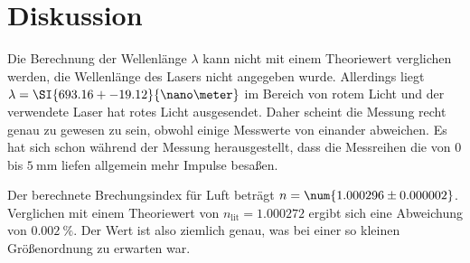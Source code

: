 \section{Diskussion}
\label{sec:Diskussion}


Die Berechnung der Wellenlänge $\lambda$ kann nicht mit einem Theoriewert verglichen werden, die Wellenlänge des Lasers nicht angegeben wurde. Allerdings liegt $\lambda = \SI{693.16+-19.12}{\nano\meter}$ im Bereich von rotem Licht und der verwendete Laser hat rotes Licht ausgesendet. 
Daher scheint die Messung recht genau zu gewesen zu sein, obwohl einige Messwerte von einander abweichen.
Es hat sich schon während der Messung herausgestellt, dass die Messreihen die von $0$ bis $\SI{5}{\milli\meter}$ liefen allgemein mehr Impulse besaßen.

Der berechnete Brechungsindex für Luft beträgt $n = \num{1.000296 \pm 0.000002}$.
Verglichen mit einem Theoriewert von $n_\text{lit} = \num{1.000272}$ ergibt sich eine Abweichung von $\SI{0.002}{\percent}$. \cite{brechung}
Der Wert ist also ziemlich genau, was bei einer so kleinen Größenordnung zu erwarten war. 
